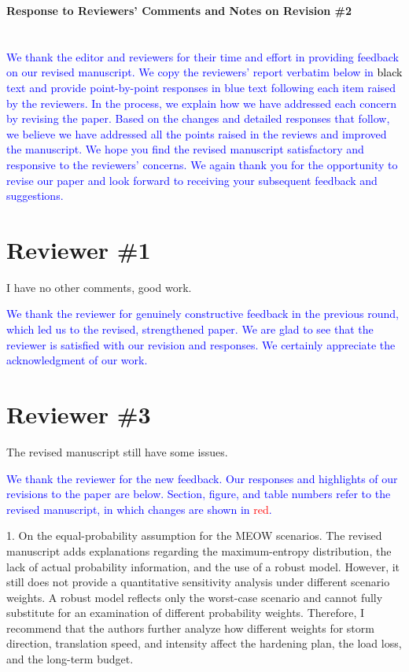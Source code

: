 \documentclass[authoryear,preprint,review,12pt]{elsarticle}\usepackage{amssymb}
\begin{document}
\textbf{\large Response to Reviewers' Comments and Notes on Revision \#2}

\section*{}

\textcolor{blue}{We thank the editor and reviewers for their time and effort in providing feedback on our revised manuscript. We copy the reviewers' report verbatim below in \textcolor{black}{black} text and provide point-by-point responses in blue text following each item raised by the reviewers. In the process, we explain how we have addressed each concern by revising the paper. Based on the changes and detailed responses that follow, we believe we have addressed all the points raised in the reviews and improved the manuscript. We hope you find the revised manuscript satisfactory and responsive to the reviewers' concerns. We again thank you for the opportunity to revise our paper and look forward to receiving your subsequent feedback and suggestions.}


\section*{Reviewer \#1}

I have no other comments, good work.

\textcolor{blue}{We thank the reviewer for genuinely constructive feedback in the previous round, which led us to the revised, strengthened paper. We are glad to see that the reviewer is satisfied with our revision and responses. We certainly appreciate the acknowledgment of our work.}




\section*{Reviewer \#3}

The revised manuscript still have some issues.

\textcolor{blue}{We thank the reviewer for the new feedback. Our responses and highlights of our revisions to the paper are below. Section, figure, and table numbers refer to the revised manuscript, in which changes are shown in \textcolor{red}{red}.}

\bigskip

1. On the equal-probability assumption for the MEOW scenarios. The revised manuscript adds explanations regarding the maximum-entropy distribution, the lack of actual probability information, and the use of a robust model. However, it still does not provide a quantitative sensitivity analysis under different scenario weights. A robust model reflects only the worst-case scenario and cannot fully substitute for an examination of different probability weights. Therefore, I recommend that the authors further analyze how different weights for storm direction, translation speed, and intensity affect the hardening plan, the load loss, and the long-term budget.
\end{document}
